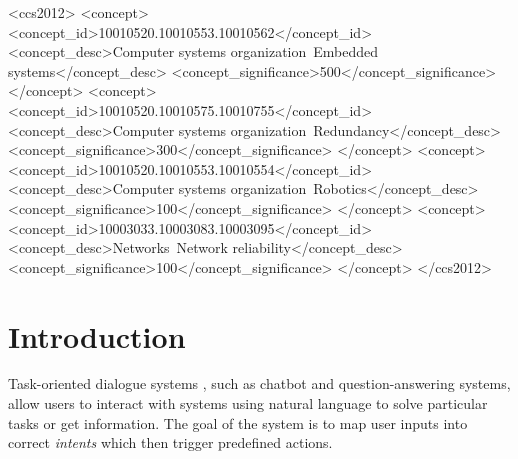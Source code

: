 \documentclass[sigconf, anonymous=true]{acmart}
\begin{document}
\begin{CCSXML}
<ccs2012>
 <concept>
  <concept_id>10010520.10010553.10010562</concept_id>
  <concept_desc>Computer systems organization~Embedded systems</concept_desc>
  <concept_significance>500</concept_significance>
 </concept>
 <concept>
  <concept_id>10010520.10010575.10010755</concept_id>
  <concept_desc>Computer systems organization~Redundancy</concept_desc>
  <concept_significance>300</concept_significance>
 </concept>
 <concept>
  <concept_id>10010520.10010553.10010554</concept_id>
  <concept_desc>Computer systems organization~Robotics</concept_desc>
  <concept_significance>100</concept_significance>
 </concept>
 <concept>
  <concept_id>10003033.10003083.10003095</concept_id>
  <concept_desc>Networks~Network reliability</concept_desc>
  <concept_significance>100</concept_significance>
 </concept>
</ccs2012>
\end{CCSXML}




\maketitle

\section{Introduction}
Task-oriented dialogue systems \cite{zhang2020recent}, such as chatbot and question-answering systems, allow users to interact with systems using natural language to solve particular tasks or get information. The goal of the system is to map user inputs into correct \textit{intents} which then trigger predefined actions. 
\end{document}
